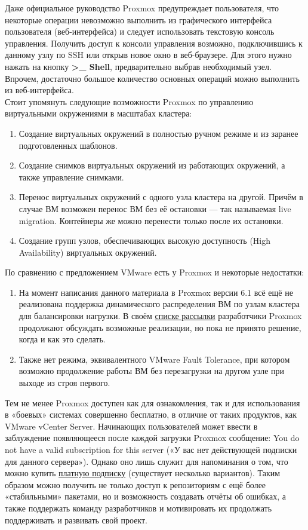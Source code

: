 \documentclass[14pt, a4paper]{article}
\begin{document}
Даже официальное руководство Proxmox предупреждает пользователя, что некоторые операции
невозможно выполнить из графического интерфейса пользователя (веб-интерфейса) и следует
использовать текстовую консоль управления. Получить доступ к консоли управления возможно,
подключившись к данному узлу по SSH или открыв новое окно в веб-браузере. Для этого нужно
нажать на кнопку \textbf{>\_ Shell}, предварительно выбрав необходимый узел. Впрочем, достаточно большое
количество основных операций можно выполнить из веб-интерфейса.\\

Стоит упомянуть следующие возможности Proxmox по управлению виртуальными окружениями в
масштабах кластера:
\begin{enumerate}
    \item Создание виртуальных окружений в полностью ручном режиме и из заранее подготовленных
    шаблонов.
    \item Создание снимков виртуальных окружений из работающих окружений, а также управление
    снимками.
    \item Перенос виртуальных окружений с одного узла кластера на другой. Причём в случае ВМ
    возможен перенос ВМ без её остановки — так называемая live migration. Контейнеры же
    можно перенести только после их остановки.
    \item Создание групп узлов, обеспечивающих высокую доступность (High Availability) виртуальных
    окружений.
\end{enumerate}
\vspace{0.35cm}

По сравнению с предложением VMware есть у Proxmox и некоторые недостатки:
\begin{enumerate}
    \item На момент написания данного материала в Proxmox версии 6.1 всё ещё не реализована
    поддержка динамического распределения ВМ по узлам кластера для балансировки нагрузки.
    В своём \href{https://lists.proxmox.com/pipermail/pve-devel/2019-May/037173.html}{списке рассылки} разработчики Proxmox продолжают обсуждать возможные
    реализации, но пока не принято решение, когда и как это сделать.
    \item Также нет режима, эквивалентного VMware Fault Tolerance, при котором возможно
    продолжение работы ВМ без перезагрузки на другом узле при выходе из строя первого.
\end{enumerate}

Тем не менее Proxmox доступен как для ознакомления, так и для использования в «боевых» системах
совершенно бесплатно, в отличие от таких продуктов, как VMware vCenter Server. Начинающих
пользователей может ввести в заблуждение появляющееся после каждой загрузки Proxmox
сообщение: You do not have a valid subscription for this server («У вас нет действующей подписки для
данного сервера»). Однако оно лишь служит для напоминания о том, что можно купить \href{https://pve.proxmox.com/wiki/Subscriptions}{платную
подписку} (существует несколько вариантов). Таким образом можно получить не только доступ к
репозиториям с ещё более «стабильными» пакетами, но и возможность создавать отчёты об ошибках,
а также поддержать команду разработчиков и мотивировать их продолжать поддерживать и развивать
свой проект.
\end{document}
